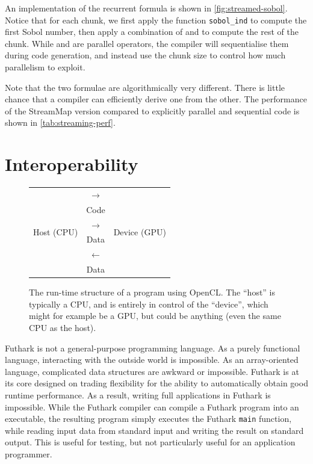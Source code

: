 An implementation of the recurrent formula is shown in
\cref{fig:streamed-sobol}.  Notice that for each chunk, we first apply
the function \texttt{sobol\_ind} to compute the first Sobol number,
then apply a combination of  and  to compute the rest
of the chunk.  While  and  are parallel operators,
the compiler will sequentialise them during code generation, and
instead use the chunk size to control how much parallelism to exploit.

Note that the two formulae are algorithmically very different.  There
is little chance that a compiler can efficiently derive one from the
other.  The performance of the StreamMap{} version compared to
explicitly parallel and sequential code is shown in
\cref{tab:streaming-perf}.

\section{Interoperability}
\label{sec:interoperability}

\begin{figure}
\centering
\begin{tabular}{|c|c|c|}
  \cline{1-1}  \cline{3-3}
    \multirow{6}{*}{Host (CPU)} &$\longrightarrow$& \multirow{6}{*}{Device (GPU)} \\
    &Code& \\
    &$\longrightarrow$& \\
    &Data& \\
    &$\longleftarrow$& \\
    &Data& \\ \cline{1-1}  \cline{3-3}
  \end{tabular}

  \caption{The run-time structure of a program using OpenCL.  The
    ``host'' is typically a CPU, and is entirely in control of the
    ``device'', which might for example be a GPU, but could be
    anything (even the same CPU as the host).}
  \label{fig:opencl-structure}
\end{figure}

Futhark is not a general-purpose programming language.  As a purely
functional language, interacting with the outside world is impossible.
As an array-oriented language, complicated data structures are awkward
or impossible.  Futhark is at its core designed on trading flexibility
for the ability to automatically obtain good runtime performance.  As
a result, writing full applications in Futhark is impossible.  While
the Futhark compiler can compile a Futhark program into an executable,
the resulting program simply executes the Futhark \texttt{main}
function, while reading input data from standard input and writing the
result on standard output.  This is useful for testing, but not
particularly useful for an application programmer.


